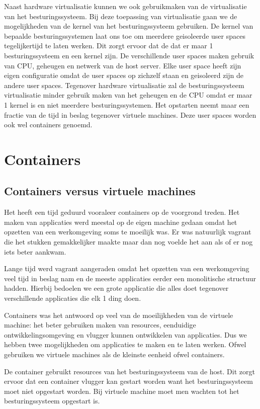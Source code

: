 \documentclass[pdftex,a4paper,12pt,twoside]{report}
\begin{document}
Naast hardware virtualisatie kunnen we ook gebruikmaken van de virtualisatie van het besturingssysteem. Bij deze toepassing van virtualisatie gaan we de mogelijkheden van de kernel van het besturingssysteem gebruiken. De kernel van bepaalde besturingssystemen laat ons toe om meerdere geisoleerde user spaces tegelijkertijd te laten werken. Dit zorgt ervoor dat de dat er maar 1 besturingssysteem en een kernel zijn. De verschillende user spaces maken gebruik van CPU, geheugen en netwerk van de host server. Elke user space heeft zijn eigen configuratie omdat de user spaces op zichzelf staan en geisoleerd zijn de andere user spaces. Tegenover hardware virtualisatie zal de besturingssysteem virtualisatie minder gebruik maken van het geheugen en de CPU omdat er maar 1 kernel is en niet meerdere besturingssystemen. Het opstarten neemt maar een fractie van de tijd in beslag tegenover virtuele machines. Deze user spaces worden ook wel containers genoemd. 

\chapter{Containers}
\label{ch:Containers}

\section{Containers versus virtuele machines}

Het heeft een tijd geduurd vooraleer containers op de voorgrond treden. Het maken van applicaties werd meestal op de eigen machine gedaan omdat het opzetten van een werkomgeving soms te moeilijk was. Er was natuurlijk vagrant die het stukken gemakkelijker maakte maar dan nog voelde het aan als of er nog iets beter aankwam. 

Lange tijd werd vagrant aangeraden omdat het opzetten van een werkomgeving veel tijd in beslag nam en de meeste applicaties eerder een monolitische structuur hadden. Hierbij bedoelen we een grote applicatie die alles doet tegenover verschillende applicaties die elk 1 ding doen.

Containers was het antwoord op veel van de moeilijkheden van de virtuele machine: het beter gebruiken maken van resources, eenduidige ontwikkelingsomgeving en vlugger kunnen ontwikkelen van applicaties. Dus we hebben twee mogelijkheden om applicaties te maken en te laten werken. Ofwel gebruiken we virtuele machines als de kleinste eenheid ofwel containers.

De container gebruikt resources van het besturingssysteem van de host. Dit zorgt ervoor dat een container vlugger kan gestart worden want het besturingssysteem moet niet opgestart worden. Bij virtuele machine moet men wachten tot het besturingssysteem opgestart is. 
\end{document}
